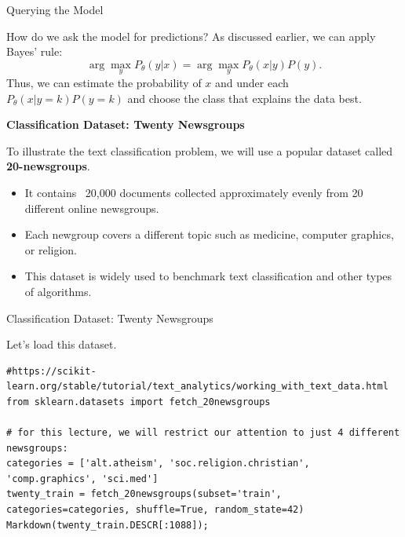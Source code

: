 \documentclass[../../generative_classifiers.tex]{subfiles}
\begin{document}
\begin{frame}[fragile]{Querying the Model}



How do we ask the model for predictions? As discussed earlier, we can apply Bayes' rule:
$$\arg\max_y P_\theta(y|x) = \arg\max_y P_\theta(x|y)P(y).$$
Thus, we can estimate the probability of $x$ and under each $P_\theta(x|y=k)P(y=k)$ and choose the class that explains the data best.

\vspace{0.2cm}

\textbf{Classification Dataset: Twenty Newsgroups}

To illustrate the text classification problem, we will use a popular dataset called \textbf{20-newsgroups}. 


\begin{itemize}
    \item It contains ~20,000 documents collected approximately evenly from 20 different online newsgroups.
    \item Each newgroup covers a different topic such as medicine, computer graphics, or religion.
    \item This dataset is widely used to benchmark text classification and other types of algorithms.
\end{itemize}

\end{frame}

\begin{frame}[fragile]{Classification Dataset: Twenty Newsgroups}

Let's load this dataset.


\begin{lstlisting}
#https://scikit-learn.org/stable/tutorial/text_analytics/working_with_text_data.html
from sklearn.datasets import fetch_20newsgroups

# for this lecture, we will restrict our attention to just 4 different newsgroups:
categories = ['alt.atheism', 'soc.religion.christian', 'comp.graphics', 'sci.med']
twenty_train = fetch_20newsgroups(subset='train', categories=categories, shuffle=True, random_state=42)
Markdown(twenty_train.DESCR[:1088]);
\end{lstlisting}
\end{frame}
\end{document}
